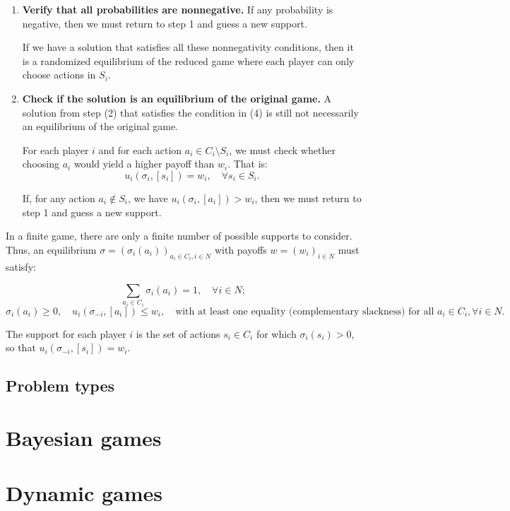 \documentclass{article}
\begin{document}
\begin{enumerate}
    \item \textbf{Verify that all probabilities are nonnegative.} If any probability is negative, then we must return to step 1 and guess a new support.

    If we have a solution that satisfies all these nonnegativity conditions, then it is a randomized equilibrium of the reduced game where each player can only choose actions in \( S_i \).

    \item \textbf{Check if the solution is an equilibrium of the original game.} A solution from step (2) that satisfies the condition in (4) is still not necessarily an equilibrium of the original game.

    For each player \( i \) and for each action \( a_i \in C_i \setminus S_i \), we must check whether choosing \( a_i \) would yield a higher payoff than \( w_i \). That is:
    \[
    u_i(\sigma_i, [s_i]) = w_i, \quad \forall s_i \in S_i.
    \]

    If, for any action \( a_i \notin S_i \), we have \( u_i(\sigma_i, [a_i]) > w_i \), then we must return to step 1 and guess a new support.

\end{enumerate}

In a finite game, there are only a finite number of possible supports to consider. Thus, an equilibrium \( \sigma = (\sigma_i(a_i))_{a_i \in C_i, i \in N} \) with payoffs \( w = (w_i)_{i \in N} \) must satisfy:

\[
\sum_{a_i \in C_i} \sigma_i(a_i) = 1, \quad \forall i \in N;
\]
\[
\sigma_i(a_i) \geq 0, \quad u_i(\sigma_{-i}, [a_i]) \leq w_i, \quad \text{with at least one equality (complementary slackness) for all } a_i \in C_i, \forall i \in N.
\]

The support for each player \( i \) is the set of actions \( s_i \in C_i \) for which \( \sigma_i(s_i) > 0 \), so that \( u_i(\sigma_{-i}, [s_i]) = w_i \).


\subsection{Problem types}

\section{Bayesian games}\label{bayes}

\section{Dynamic games}\label{DG}
\end{document}

